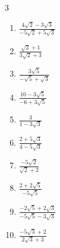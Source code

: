 \begin{multicols}{3}
\begin{enumerate}

  \item $\displaystyle \frac{4\sqrt{2}-3\sqrt{3}}{-5\sqrt{2}+5\sqrt{3}}$


  \item $\displaystyle \frac{\sqrt{2}+1}{3\sqrt{2}+3}$


  \item $\displaystyle \frac{3\sqrt{5}}{-\sqrt{5}+\sqrt{3}}$


\columnbreak %

\resetques

  \item $\displaystyle \frac{10-3\sqrt{5}}{-6+3\sqrt{5}}$


  \item $\displaystyle \frac{3}{1-3\sqrt{3}}$


  \item $\displaystyle \frac{2+5\sqrt{3}}{4-5\sqrt{3}}$


  \item $\displaystyle \frac{-5\sqrt{2}}{\sqrt{2}+2}$


  \item $\displaystyle \frac{2+2\sqrt{5}}{-5\sqrt{5}}$


\columnbreak %

  \item $\displaystyle \frac{-2\sqrt{5}+2\sqrt{3}}{-5\sqrt{5}-3\sqrt{3}}$


  \item $\displaystyle \frac{-5\sqrt{3}+2}{2\sqrt{3}+3}$



\end{enumerate}
\end{multicols}
